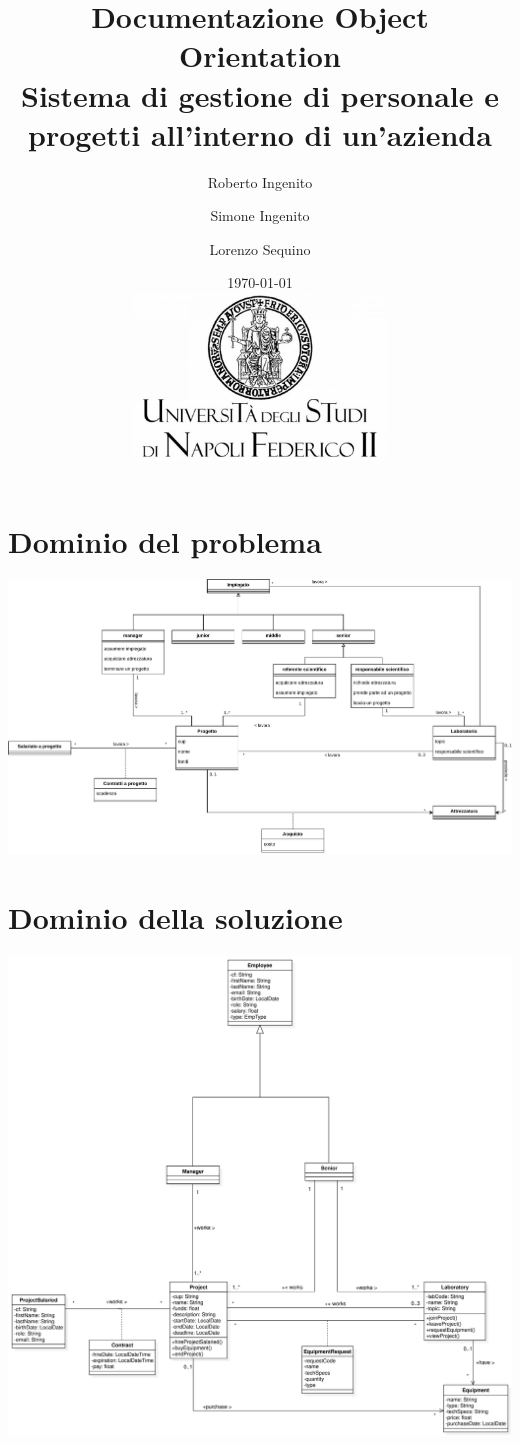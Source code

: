 \documentclass{article}
\title{Documentazione Object Orientation\\
Sistema di gestione di personale e progetti all'interno di un'azienda }
\author{Roberto Ingenito \and Simone Ingenito \and Lorenzo Sequino}
\date{\today \\ \vspace{2cm} \includegraphics[width=0.5\textwidth]{images/logo.png}}
\begin{document}
\maketitle

\newpage

\tableofcontents

\newpage


\section{Dominio del problema}
\includegraphics[width=\textwidth]{images/dominio_problema.pdf}

\section{Dominio della soluzione}
\includegraphics[width=\textwidth]{images/dominio_soluzione.png}
\end{document}
